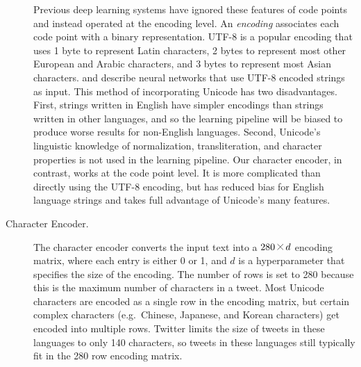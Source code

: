 \documentclass[sigconf,10pt]{acmart}
\renewcommand{\times}{\mathbin{\tikz [x=1.4ex,y=1.4ex,line width=.1ex] \draw (0,0) -- (1,1) (0,1) -- (1,0);}}%
\newcommand{\defn}[1]{\textit{#1}}
\begin{document}
\begin{description}
Previous deep learning systems have ignored these features of code points and instead operated at the encoding level.
An \defn{encoding} associates each code point with a binary representation. 
UTF-8 is a popular encoding that uses 1 byte to represent Latin characters,
2 bytes to represent most other European and Arabic characters,
and 3 bytes to represent most Asian characters.
\citet{gillick2015multilingual} and \citet{plank2016multilingual} describe neural networks that use UTF-8 encoded strings as input.
This method of incorporating Unicode has two disadvantages.
First, strings written in English have simpler encodings than strings written in other languages,
and so the learning pipeline will be biased to produce worse results for non-English languages.
Second, Unicode's linguistic knowledge of normalization, transliteration, and character properties is not used in the learning pipeline.
Our character encoder, in contrast, works at the code point level.
It is more complicated than directly using the UTF-8 encoding,
but has reduced bias for English language strings and takes full advantage of Unicode's many features.

\item[Character Encoder.]
The character encoder converts the input text into a $280\times d$ encoding matrix,
where each entry is either 0 or 1,
and $d$ is a hyperparameter that specifies the size of the encoding.
The number of rows is set to 280 because this is the maximum number of characters in a tweet.
Most Unicode characters are encoded as a single row in the encoding matrix,
but certain complex characters (e.g.\ Chinese, Japanese, and Korean characters) get encoded into multiple rows.
Twitter limits the size of tweets in these languages to only 140 characters,
so tweets in these languages still typically fit in the 280 row encoding matrix.


\end{description}
\end{document}

